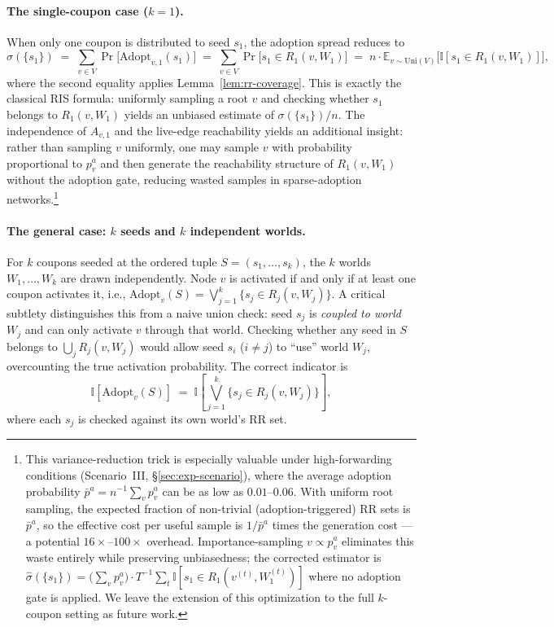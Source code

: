 \documentclass[sigconf]{acmart}
\begin{document}
\paragraph{The single-coupon case ($k=1$).}
When only one coupon is distributed to seed $s_1$, the adoption spread reduces to
\[
  \sigma(\{s_1\}) \;=\; \sum_{v \in V} \Pr\bigl[\mathrm{Adopt}_{v,1}(s_1)\bigr]
  \;=\; \sum_{v \in V} \Pr\bigl[s_1 \in R_1(v,W_1)\bigr]
  \;=\; n\cdot\mathbb{E}_{v\sim\mathrm{Uni}(V)}\bigl[\mathbb{I}[s_1 \in R_1(v,W_1)]\bigr],
\]
where the second equality applies Lemma~\ref{lem:rr-coverage}. This is exactly the classical RIS formula: uniformly sampling a root $v$ and checking whether $s_1$ belongs to $R_1(v,W_1)$ yields an unbiased estimate of $\sigma(\{s_1\})/n$. The independence of $A_{v,1}$ and the live-edge reachability yields an additional insight: rather than sampling $v$ uniformly, one may sample $v$ with probability proportional to $p_v^a$ and then generate the reachability structure of $R_1(v,W_1)$ without the adoption gate, reducing wasted samples in sparse-adoption networks.\footnote{This variance-reduction trick is especially valuable under high-forwarding conditions (Scenario~III, \S\ref{sec:exp-scenario}), where the average adoption probability $\bar{p}^a = n^{-1}\sum_v p_v^a$ can be as low as $0.01$--$0.06$. With uniform root sampling, the expected fraction of non-trivial (adoption-triggered) RR sets is $\bar{p}^a$, so the effective cost per useful sample is $1/\bar{p}^a$ times the generation cost --- a potential $16\times$--$100\times$ overhead. Importance-sampling $v \propto p_v^a$ eliminates this waste entirely while preserving unbiasedness; the corrected estimator is $\hat{\sigma}(\{s_1\}) = \bigl(\sum_v p_v^a\bigr) \cdot T^{-1}\sum_t \mathbb{I}[s_1 \in R_1(v^{(t)}, W_1^{(t)})]$ where no adoption gate is applied. We leave the extension of this optimization to the full $k$-coupon setting as future work.}

\paragraph{The general case: $k$ seeds and $k$ independent worlds.}
For $k$ coupons seeded at the ordered tuple $S = (s_1, \ldots, s_k)$, the $k$ worlds $W_1, \ldots, W_k$ are drawn independently. Node $v$ is activated if and only if at least one coupon activates it, i.e., $\mathrm{Adopt}_v(S) = \bigvee_{j=1}^k \{s_j \in R_j(v, W_j)\}$.
A critical subtlety distinguishes this from a naive union check: seed $s_j$ is \emph{coupled to world $W_j$} and can only activate $v$ through that world. Checking whether any seed in $S$ belongs to $\bigcup_j R_j(v, W_j)$ would allow seed $s_i$ ($i \neq j$) to ``use'' world $W_j$, overcounting the true activation probability. The correct indicator is
\[
  \mathbb{I}[\mathrm{Adopt}_v(S)] \;=\; \mathbb{I}\!\left[\bigvee_{j=1}^{k} \{s_j \in R_j(v,W_j)\}\right],
\]
where each $s_j$ is checked against its own world's RR set.
\end{document}
